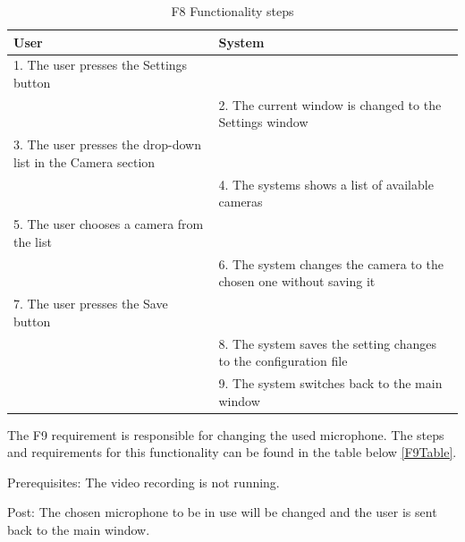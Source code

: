 \begin{table}[htbp]
\begin{center}
\begin{tabular}
{|p{180pt}|p{180pt}|}
\hline
 User & System\\
\hline 
\hline 1. The user presses the Settings button &  \\
\hline  & 2. The current window is changed to the Settings window \\
\hline 3. The user presses the drop-down list in the Camera section&  \\
\hline  & 4. The systems shows a list of available cameras \\
\hline 5. The user chooses a camera from the list &  \\
\hline  & 6. The system changes the camera to the chosen one without saving it \\
\hline 7. The user presses the Save button &  \\
\hline  & 8. The system saves the setting changes to the configuration file \\
\hline  & 9. The system switches back to the main window \\
\hline
\end{tabular}
\end{center}
\caption{F8 Functionality steps}
\label{F8Table}
\end{table}

\par The F9 requirement is responsible for changing the used microphone. The steps and requirements for this functionality can be found in the table below \ref{F9Table}.
\par Prerequisites: The video recording is not running.
\par Post: The chosen microphone to be in use will be changed and the user is sent back to the main window.

